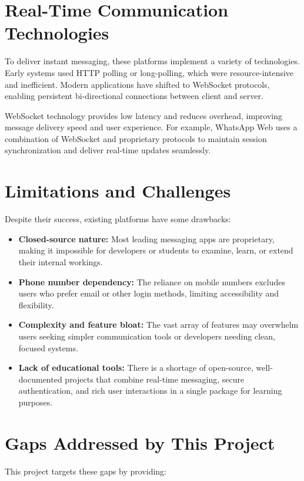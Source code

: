 \documentclass[12pt,a4paper]{report}
\begin{document}
\section{Real-Time Communication Technologies}

To deliver instant messaging, these platforms implement a variety of technologies. Early systems used HTTP polling or long-polling, which were resource-intensive and inefficient. Modern applications have shifted to WebSocket protocols, enabling persistent bi-directional connections between client and server.

WebSocket technology provides low latency and reduces overhead, improving message delivery speed and user experience. For example, WhatsApp Web uses a combination of WebSocket and proprietary protocols to maintain session synchronization and deliver real-time updates seamlessly.

\section{Limitations and Challenges}

Despite their success, existing platforms have some drawbacks:

\begin{itemize}
    \item \textbf{Closed-source nature:} Most leading messaging apps are proprietary, making it impossible for developers or students to examine, learn, or extend their internal workings.
    \item \textbf{Phone number dependency:} The reliance on mobile numbers excludes users who prefer email or other login methods, limiting accessibility and flexibility.
    \item \textbf{Complexity and feature bloat:} The vast array of features may overwhelm users seeking simpler communication tools or developers needing clean, focused systems.
    \item \textbf{Lack of educational tools:} There is a shortage of open-source, well-documented projects that combine real-time messaging, secure authentication, and rich user interactions in a single package for learning purposes.
\end{itemize}

\section{Gaps Addressed by This Project}

This project targets these gaps by providing:
\end{document}
